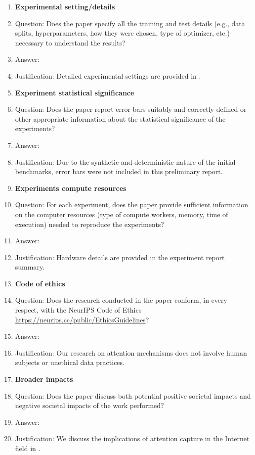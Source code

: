 \begin{enumerate}
\item {\bf Experimental setting/details}
    \item[] Question: Does the paper specify all the training and test details (e.g., data splits, hyperparameters, how they were chosen, type of optimizer, etc.) necessary to understand the results?
    \item[] Answer: \answerYes{}
    \item[] Justification: Detailed experimental settings are provided in .

\item {\bf Experiment statistical significance}
    \item[] Question: Does the paper report error bars suitably and correctly defined or other appropriate information about the statistical significance of the experiments?
    \item[] Answer: \answerNo{}
    \item[] Justification: Due to the synthetic and deterministic nature of the initial benchmarks, error bars were not included in this preliminary report.

\item {\bf Experiments compute resources}
    \item[] Question: For each experiment, does the paper provide sufficient information on the computer resources (type of compute workers, memory, time of execution) needed to reproduce the experiments?
    \item[] Answer: \answerYes{}
    \item[] Justification: Hardware details are provided in the experiment report summary.

\item {\bf Code of ethics}
    \item[] Question: Does the research conducted in the paper conform, in every respect, with the NeurIPS Code of Ethics \url{https://neurips.cc/public/EthicsGuidelines}?
    \item[] Answer: \answerYes{}
    \item[] Justification: Our research on attention mechanisms does not involve human subjects or unethical data practices.

\item {\bf Broader impacts}
    \item[] Question: Does the paper discuss both potential positive societal impacts and negative societal impacts of the work performed?
    \item[] Answer: \answerYes{}
    \item[] Justification: We discuss the implications of attention capture in the Internet field in .


\end{enumerate}
